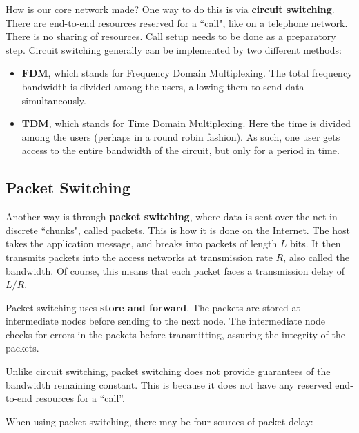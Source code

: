 \documentclass[12pt,letterpaper]{amsbook}
\theoremstyle{definition}
\begin{document}
How is our core network made? One way to do this is via \textbf{circuit switching}. There are end-to-end resources reserved for a ``call", like on a telephone network. There is no sharing of resources. Call setup needs to be done as a preparatory step. Circuit switching generally can be implemented by two different methods:

\begin{itemize}
  \item \textbf{FDM}, which stands for Frequency Domain Multiplexing. The total frequency bandwidth is divided among the users, allowing them to send data simultaneously. 
  \item \textbf{TDM}, which stands for Time Domain Multiplexing. Here the time is divided among the users (perhaps in a round robin fashion). As such, one user gets access to the entire bandwidth of the circuit, but only for a period in time.
\end{itemize}

\subsection{Packet Switching}

Another way is through \textbf{packet switching}, where data is sent over the net in discrete ``chunks", called packets. This is how it is done on the Internet. The host takes the application message, and breaks into packets of length $L$ bits. It then transmits packets into the access networks at transmission rate $R$, also called the bandwidth. Of course, this means that each packet faces a transmission delay of $L/R$.

Packet switching uses \textbf{store and forward}. The packets are stored at intermediate nodes before sending to the next node. The intermediate node checks for errors in the packets before transmitting, assuring the integrity of the packets.

Unlike circuit switching, packet switching does not provide guarantees of the bandwidth remaining constant. This is because it does not have any reserved end-to-end resources for a ``call''.

When using packet switching, there may be four sources of packet delay:
\end{document}
